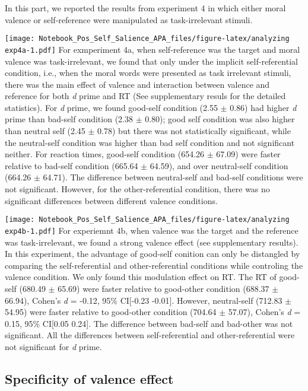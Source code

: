 \documentclass[
  man]{apa6}
\begin{document}
In this part, we reported the results from experiment 4 in which either moral valence or self-reference were manipulated as task-irrelevant stimuli.

\texttt{[image: Notebook\_Pos\_Self\_Salience\_APA\_files/figure-latex/analyzing exp4a-1.pdf]}
For exmperiment 4a, when self-reference was the target and moral valence was task-irrelevant, we found that only under the implicit self-referential condition, i.e., when the moral words were presented as task irrelevant stimuli, there was the main effect of valence and interaction between valence and reference for both \emph{d} prime and RT (See supplementary resuls for the detailed statistics). For \emph{d} prime, we found good-self condition (2.55 \(\pm\) 0.86) had higher \emph{d} prime than bad-self condition (2.38 \(\pm\) 0.80); good self condition was also higher than neutral self (2.45 \(\pm\) 0.78) but there was not statistically significant, while the neutral-self condition was higher than bad self condition and not significant neither. For reaction times, good-self condition (654.26 \(\pm\) 67.09) were faster relative to bad-self condition (665.64 \(\pm\) 64.59), and over neutral-self condition (664.26 \(\pm\) 64.71). The difference between neutral-self and bad-self conditions were not significant. However, for the other-referential condition, there was no significant differences between different valence conditions.

\texttt{[image: Notebook\_Pos\_Self\_Salience\_APA\_files/figure-latex/analyzing exp4b-1.pdf]}
For experiemnt 4b, when valence was the target and the reference was task-irrelevant, we found a strong valence effect (see supplementary results). In this experiment, the advantage of good-self conition can only be distangled by comparing the self-referential and other-referential conditions while controling the valence condition. We only found this modulation effect on RT. The RT of good-self (680.49 \(\pm\) 65.69) were faster relative to good-other condition (688.37 \(\pm\) 66.94), Cohen's \emph{d} = -0.12, 95\% CI{[}-0.23 -0.01{]}. However, neutral-self (712.83 \(\pm\) 54.95) were faster relative to good-other condition (704.64 \(\pm\) 57.07), Cohen's \emph{d} = 0.15, 95\% CI{[}0.05 0.24{]}. The difference between bad-self and bad-other was not significant. All the differences between self-referential and other-referential were not significant for \emph{d} prime.

\hypertarget{specificity-of-valence-effect}{%
\subsection{Specificity of valence effect}\label{specificity-of-valence-effect}}
\end{document}

